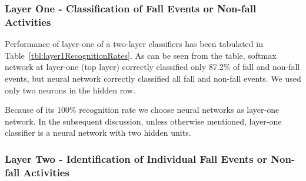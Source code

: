 \documentclass[]{IEEEtran}
\begin{document}
\subsubsection{Layer One - Classification of Fall Events or Non-fall Activities }
\label{sec:LayerOneFallAndNonFallIdentification}

Performance of layer-one of a two-layer classifiers has been tabulated in Table~\ref{tbl:layer1RecognitionRates}. As can be seen from the table, softmax network at layer-one (top layer) correctly classified only 87.2\% of fall and non-fall events, but neural network correctly classified all fall and non-fall events. We used only two neurons in the hidden row.
\par
 Because of its 100\% recognition rate we choose neural networks as layer-one network. In the subsequent discussion, unless otherwise mentioned,  layer-one classifier is a neural network with two hidden units.

%

\subsubsection{Layer Two - Identification of Individual Fall Events or Non-fall 
Activities}
\label{sec:LayerTwoFallOrNonFallEventIdentification}
\end{document}
